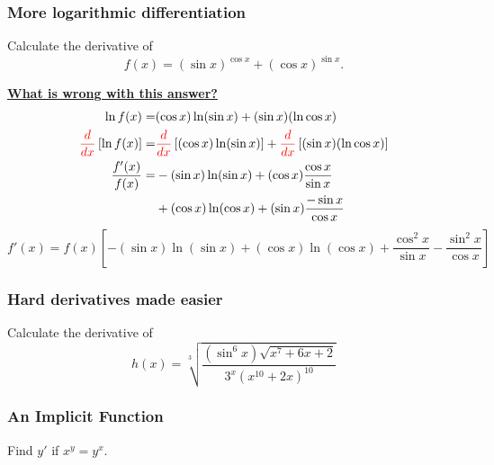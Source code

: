 \documentclass[14pt]{beamer}
\newcommand{\setsize}[1]{\fontsize{#1}{#1}\selectfont} %
\newcommand{\smallerfont}{\setsize{13}} %
\begin{document}
\begin{frame}[t]
\smallerfont
\frametitle{More logarithmic differentiation}

\begin{block}{}
Calculate the derivative of 
	$$
		f(x) = \left( \sin x \right)^{\cos x} + \left( \cos x \right)^{\sin x}.
	$$
\end{block}


\pause \vfill

{\bf \underline{What is wrong with this answer?}}
	\begin{align*}
		\ln f(x)  = & (\cos x) \ln ( \sin x )+ ( \sin x ) ( \ln \cos x ) \\
		{\color{red} \frac{d}{dx}} \left[  \ln f(x) \right]  = & {\color{red} \frac{d}{dx}} \left[ (\cos x) \ln ( \sin x ) \right] + 
			 {\color{red} \frac{d}{dx}} \left[ ( \sin x ) ( \ln \cos x ) \right] \\
		\frac{f'(x)}{f(x)}  = & - ( \sin x ) \ln (\sin x) + (\cos x ) \frac{\cos x}{\sin x}  \\
				& + ( \cos x ) \ln (\cos x) + (\sin x ) \frac{- \sin x}{\cos x}
	\end{align*}
	$${f'(x) = f(x) \left[ - (\sin x) \ln(\sin x) + (\cos x) \ln (\cos x) + \frac{\cos^2 x}{\sin x} - \frac{\sin^2 x}{\cos x} \right]}$$
\end{frame}
\begin{frame}[t]
\frametitle{Hard derivatives made easier}

\vspace{5mm} 
\begin{block}{}
Calculate the derivative of 
	$$
		h(x) = \sqrt[3]{\frac{\left( \sin^6 x \right) \sqrt{x^7+6x+2}}{3^x \left(x^{10}+2x\right)^{10}}}
	$$
\end{block}


\end{frame}

\begin{frame}[t]
\frametitle{An Implicit Function}

\vspace{5mm} 
\begin{block}{}
Find $y'$ if $x^y=y^x$.
\end{block}
\end{frame}
\end{document}
